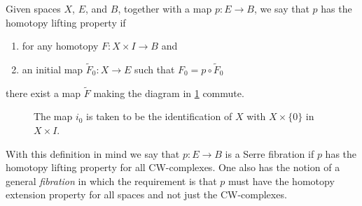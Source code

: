 \documentclass[../main.tex]{subfiles}
\begin{document}
\begin{definition}
   Given spaces \( X \), \( E \), and \( B \), together with a map
   \( p:E\rightarrow B \), we say that \( p \) has the homotopy lifting
   property if
      \begin{enumerate}[label=(\roman*)]
         \item for any homotopy \( F:X\times I \rightarrow B \) and
         \item an initial map \( \tilde{F}_0:X\rightarrow E \) such
            that \(F_0 = p\circ \tilde{F}_0 \)
      \end{enumerate}
   there exist a map \( \tilde{F} \) making the diagram in \cref{fig:homotopy-lifting-property}
   commute.
\end{definition}
\begin{figure}
   \centering
   \caption{The map \( i_0 \) is taken to be the identification of
   \( X \) with \( X\times \{0\}  \) in \( X\times I \).}
   \label{fig:homotopy-lifting-property}
\end{figure}

With this definition in mind we say that \( p:E\rightarrow B \) is a
Serre fibration if \( p \) has the homotopy lifting property for all
CW-complexes. One also has the notion of a general \emph{fibration} in
which the requirement is that \( p \) must have the homotopy extension
property for all spaces and not just the CW-complexes.
\end{document}
